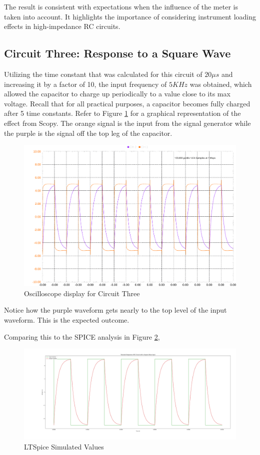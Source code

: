\documentclass[12pt]{article}
\begin{document}
The result is consistent with expectations when the influence of the meter is
taken into account. It highlights the importance of considering instrument
loading effects in high-impedance RC circuits.

\subsection{Circuit Three: Response to a Square Wave}
Utilizing the time constant that was calculated for this circuit of $20\mu s$
and increasing it by a factor of 10, the input frequency of $5KHz$ was obtained,
which allowed the capacitor to charge up periodically to a value close to its
max voltage. Recall that for all practical purposes, a capacitor becomes fully
charged after 5 time constants. Refer to Figure \ref{fig:circuit3oscope} for a
graphical representation of the effect from Scopy. The orange signal is the
input from the signal generator while the purple is the signal off the top leg
of the capacitor.
\begin{figure}[H]
	\centering
	\includegraphics[width=\textwidth]{05_scopy1}
	\caption{Oscilloscope display for Circuit Three}
	\label{fig:circuit3oscope}
\end{figure}

Notice how the purple waveform gets nearly to the top level of the input
waveform. This is the expected outcome.

Comparing this to the SPICE analysis in Figure \ref{fig:circuit3pspice},

\begin{figure}[H]
	\centering
	\includegraphics[width=\textwidth]{05_ltspicecircuit3}
	\caption{LTSpice Simulated Values}
	\label{fig:circuit3pspice}
\end{figure}
\end{document}
